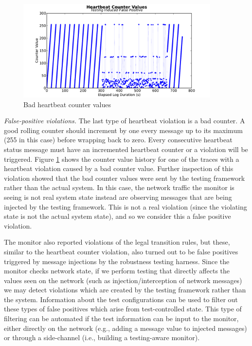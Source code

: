 \begin{figure}[t]
\centering
\includegraphics[width=4.0in]{img/hb2}
\caption{Bad heartbeat counter values \label{fig:hb_badcounter}}
\end{figure}

\textit{False-positive violations.}
The last type of heartbeat violation is a bad counter.
A good rolling counter should increment by one every message up to its maximum (255 in this case) before wrapping back to zero.
Every consecutive heartbeat status message must have an incremented heartbeat counter or a violation will be triggered. Figure \ref{fig:hb_badcounter} shows the counter value history for one of the traces with a heartbeat violation caused by a bad counter value.
%
Further inspection of this violation showed that the bad counter values were sent by the testing framework rather than the actual system. In this case, the network traffic the monitor is seeing is not real system state
instead are observing
messages that are being injected by the testing framework.
This is not a real violation (since the violating state is not the actual system state),
and so we consider this a false positive violation.



The monitor also reported violations of the legal transition rules, but these, similar to the heartbeat counter violation, also turned out to be false positives triggered by message injections by the robustness testing harness. Since the monitor checks network state, if we perform testing that directly affects the values seen on the network (such as injection/interception of network messages) we may detect violations which are created by the testing framework rather than the system.
Information about the test configurations can be used to filter out these types of false positives which arise from test-controlled state.
This type of filtering can be automated if the test information can be input to the monitor, either directly on the network (e.g., adding a message value to injected messages) or through a side-channel (i.e., building a testing-aware monitor).
